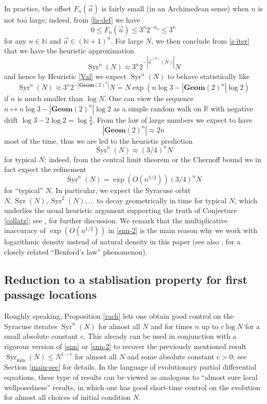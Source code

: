 \documentclass[12pt,a4paper,reqno]{amsart}
\numberwithin{equation}{section}
\theoremstyle{plain}
\theoremstyle{definition}
\newcommand\R{\mathbb{R}}
\newcommand\N{\mathbb{N}}
\newcommand\Geom{\mathbf{Geom}}
\newcommand\Syr{{\operatorname{Syr}}}
\begin{document}
In practice, the offset $F_n(\vec a)$ is fairly small (in an Archimedean sense) when $n$ is not too large; indeed, from \eqref{fn-def} we have
\begin{equation}\label{fn-bound}
0 \leq F_n(\vec a) \leq 3^n 2^{-a_n} \leq 3^n
\end{equation}
for any $n \in \N$ and $\vec a \in (\N+1)^n$.  For large $N$, we then conclude from \eqref{s-iter} that we have the heuristic approximation
$$ \Syr^n(N) \approx 3^n 2^{-|\vec a^{(n)}(N)|} N $$
and hence by Heuristic \ref{Val} we expect $\Syr^n(N)$ to behave statistically like
\begin{equation}\label{snusnu}
 \Syr^n(N) \approx 3^n 2^{-|\Geom(2)^n|} N = N \exp( n \log 3 - |\Geom(2)^n| \log 2 )
\end{equation}
if $n$ is much smaller than $\log N$.
One can view the sequence $n \mapsto n \log 3 - |\Geom(2)^n| \log 2$ as a simple random walk on $\R$ with negative drift $\log 3 - 2 \log 2 = \log \frac{3}{4}$.  From the law of large numbers we expect to have 
\begin{equation}\label{lln}
|\Geom(2)^n| \approx 2n
\end{equation}
most of the time, thus we are led to the heuristic prediction
\begin{equation}\label{snn}
 \Syr^n(N) \approx (3/4)^n N
\end{equation}
for typical $N$; indeed, from the central limit theorem or the Chernoff bound we in fact expect the refinement
\begin{equation}\label{snn-2}
 \Syr^n(N) = \exp( O(n^{1/2}) ) (3/4)^n N
\end{equation}
for ``typical'' $N$.  In particular, we expect the Syracuse orbit $N, \Syr(N), \Syr^2(N), \dots$ to decay geometrically in time for typical $N$, which underlies the usual heuristic argument supporting the truth of Conjecture \ref{collatz}; see \cite{lw}, \cite{kont} for further discussion.  We remark that the multiplicative inaccuracy of $\exp( O(n^{1/2}) )$ in \eqref{snn-2} is the main reason why we work with logarithmic density instead of natural density in this paper (see also \cite{km}, \cite{ls} for a closely related ``Benford's law'' phenomenon).

\subsection{Reduction to a stablisation property for first passage locations}

Roughly speaking, Proposition \ref{rach} lets one obtain good control on the Syracuse iterates $\Syr^n(N)$ for almost all $N$ and for times $n$ up to $c \log N$ for a small absolute constant $c$.  This already can be used in conjunction with a rigorous version of \eqref{snn} or \eqref{snn-2} to recover the previously mentioned result $\Syr_{\min}(N) \leq N^{1-c}$ for almost all $N$ and some absolute constant $c>0$; see Section \ref{main-sec} for details.  In the language of evolutionary partial differential equations, these type of results can be viewed as analogous to ``almost sure local wellposedness'' results, in which one has good short-time control on the evolution for almost all choices of initial condition $N$.
\end{document}

